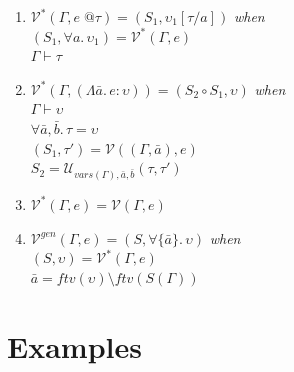 \documentclass{article}
\begin{document}
\begin{enumerate}
\item[(7)] $\mathcal{V}^*(\Gamma, e\; @\tau) = (S_1, \upsilon_1[\tau/a])$ \textit{when} \\
           \hspace*{2em} $(S_1, \forall a.\,\upsilon_1) = \mathcal{V}^*(\Gamma, e)$ \\
           \hspace*{2em} $\Gamma \vdash \tau$


\item[(8)] $\mathcal{V}^*(\Gamma, (\Lambda\bar{a}.\, e : \upsilon)) = (S_2 \circ S_1, \upsilon)$ \textit{when} \\
           \hspace*{2em} $\Gamma \vdash \upsilon$ \\
           \hspace*{2em} $\forall\bar{a},\bar{b}.\,\tau = \upsilon$ \\
           \hspace*{2em} $(S_1, \tau') = \mathcal{V}((\Gamma, \bar{a}), e)$ \\
           \hspace*{2em} $S_2 = \mathcal{U}_{\mathit{vars}(\Gamma),\bar{a},\bar{b}}(\tau, \tau')$


\item[(9)] $\mathcal{V}^*(\Gamma, e) = \mathcal{V}(\Gamma, e)$


\item[(10)] $\mathcal{V}^{gen}(\Gamma, e) = (S, \forall\{\bar{a}\}.\,\upsilon)$ \textit{when} \\
            \hspace*{2em} $(S, \upsilon) = \mathcal{V}^*(\Gamma, e)$ \\
            \hspace*{2em} $\bar{a} = \mathit{ftv}(\upsilon) \setminus \mathit{ftv}(S(\Gamma))$
\end{enumerate}

\section*{Examples}
\end{document}
